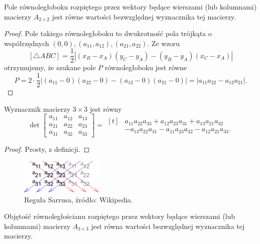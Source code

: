 \begin{fact}
    Pole równoległoboku rozpiętego przez wektory będące wierszami (lub kolumnami) macierzy $A_{2\times 2}$ jest równe wartości bezwzględnej wyznacznika tej macierzy.
\end{fact}

\begin{proof}
    Pole takiego równoległoboku to dwukrotność pola trójkąta o współrzędnych $(0, 0), (a_{11}, a_{12}), (a_{21}, a_{22})$. Ze wzoru
    \[ [\triangle ABC] = \frac{1}{2}\left|(x_B - x_A)(y_C - y_A) - (y_B - y_A)(x_C - x_A)\right| \]
    otrzymujemy, że szukane pole $P$ równoległoboku jest równe
    \[ P = 2\cdot\frac{1}{2}\left|(a_{11} - 0)(a_{22} - 0) - (a_{12} - 0)(a_{21} - 0)\right| = |a_{11}a_{22} - a_{12}a_{21}|. \]
\end{proof}

\begin{theorem}
    Wyznacznik macierzy $3 \times 3$ jest równy
    \[ \det\begin{bmatrix}
        a_{11} & a_{12} & a_{13} \\
        a_{21} & a_{22} & a_{23} \\
        a_{31} & a_{32} & a_{33}
    \end{bmatrix} = \begin{aligned}[t] &a_{11}a_{22}a_{33} + a_{12}a_{23}a_{31} + a_{13}a_{21}a_{32} \\
                                       &- a_{13}a_{22}a_{31} - a_{11}a_{23}a_{32} - a_{12}a_{21}a_{33}.\end{aligned} \]
\end{theorem}
\begin{proof}
    Prosty, z definicji.
\end{proof}

\begin{figure}[h]
    \centering
    \includegraphics[width=0.35\textwidth]{Sarrus_rule.pdf}
    \caption{Reguła Sarrusa, źródło: Wikipedia.}
\end{figure}

\begin{fact}
    Objętość równoległościanu rozpiętego przez wektory będące wierszami (lub kolumnami) macierzy $A_{3\times 3}$ jest równa wartości bezwzględnej wyznacznika tej macierzy.
\end{fact}